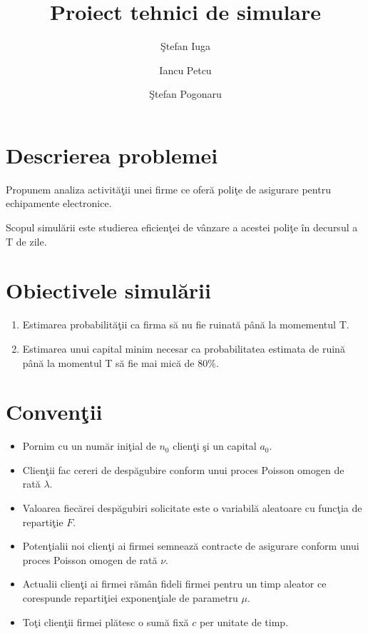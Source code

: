 \documentclass{article}
\title{Proiect tehnici de simulare}
\author{\c{S}tefan Iuga \and Iancu Petcu \and \c{S}tefan Pogonaru}
\begin{document}
	\maketitle
	\section{Descrierea problemei}
	Propunem analiza activit\u{a}\c{t}ii unei firme ce ofer\u{a} poli\c{t}e
	de asigurare pentru echipamente electronice.

	Scopul simul\u{a}rii este studierea eficien\c{t}ei de v\^{a}nzare a
	acestei poli\c{t}e \^{i}n decursul a T de zile.

	\section{Obiectivele simul\u{a}rii}
	\begin{enumerate}
		\item Estimarea probabilit\u{a}\c{t}ii ca firma s\u{a} nu fie
			ruinat\u{a} p\^{a}n\u{a} la momementul T.
		\item Estimarea unui capital minim necesar ca probabilitatea
			estimata de ruin\u{a} p\^{a}n\u{a} la momentul T s\u{a}
			fie mai mic\u{a} de 80\%.
	\end{enumerate}

	\section{Conven\c{t}ii}
	\begin{itemize}
		\item  Pornim cu un num\u{a}r ini\c{t}ial de $n_0$
			clien\c{t}i \c{s}i un capital $a_0$.
		\item Clien\c{t}ii fac cereri de desp\u{a}gubire conform unui
			proces Poisson omogen de rat\u{a}
			$\lambda$.
		\item Valoarea fiec\u{a}rei desp\u{a}gubiri solicitate este o
			variabil\u{a} aleatoare cu func\c{t}ia de 
			reparti\c{t}ie $F$.
		\item Poten\c{t}ialii noi clien\c{t}i ai firmei semneaz\u{a}
			contracte de asigurare conform unui proces Poisson
			omogen de rat\u{a} $\nu$.
		\item Actualii clien\c{t}i ai firmei r\u{a}m\^{a}n fideli
			firmei pentru un timp aleator ce corespunde
			reparti\c{t}iei exponen\c{t}iale de parametru
			$\mu$.
		\item To\c{t}i clien\c{t}ii firmei pl\u{a}tesc o sum\u{a} fix\u{a}
			$c$ per unitate de timp.
	\end{itemize}
\end{document}
